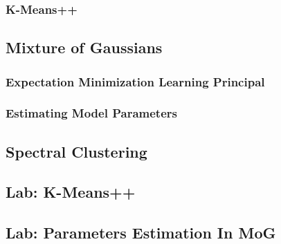             \subsubsection{}
            \subsubsection{K-Means++}
        \subsection{Mixture of Gaussians}
            \subsubsection{Expectation Minimization Learning Principal}
            \subsubsection{Estimating Model Parameters}
        \subsection{Spectral Clustering}
        \subsection{Lab: K-Means++}
        \subsection{Lab: Parameters Estimation In MoG}